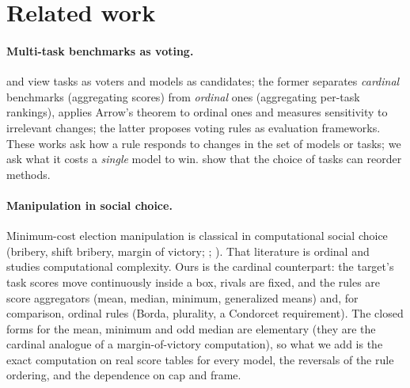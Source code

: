 \section{Related work}
\label{sec:related}
\paragraph{Multi-task benchmarks as voting.}
\citet{zhang2024tradeoffs} and \citet{lanctot2023vase} view tasks as voters and models as candidates; the former separates \emph{cardinal} benchmarks (aggregating scores) from \emph{ordinal} ones (aggregating per-task rankings), applies Arrow's theorem to ordinal ones and measures sensitivity to irrelevant changes; the latter proposes voting rules as evaluation frameworks. These works ask how a rule responds to changes in the set of models or tasks; we ask what it costs a \emph{single} model to win. \citet{dehghani2021lottery} show that the choice of tasks can reorder methods.
\paragraph{Manipulation in social choice.}
Minimum-cost election manipulation is classical in computational social choice (bribery, shift bribery, margin of victory; \citealp{faliszewski2006bribery}; \citealp{brandt2016handbook}). That literature is ordinal and studies computational complexity. Ours is the cardinal counterpart: the target's task scores move continuously inside a box, rivals are fixed, and the rules are score aggregators (mean, median, minimum, generalized means) and, for comparison, ordinal rules (Borda, plurality, a Condorcet requirement). The closed forms for the mean, minimum and odd median are elementary (they are the cardinal analogue of a margin-of-victory computation), so what we add is the exact computation on real score tables for every model, the reversals of the rule ordering, and the dependence on cap and frame.
